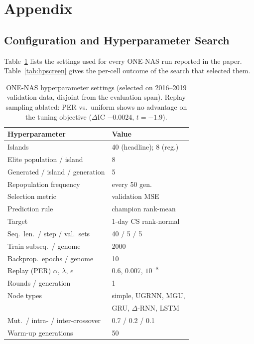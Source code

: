 
\section{Appendix}

\subsection{Configuration and Hyperparameter Search}

Table~\ref{tab:hps} lists the settings used for every ONE-NAS
run reported in the paper. Table~\ref{tab:hpscreen} gives the
per-cell outcome of the search that selected them.

\begin{table}[t]
\centering
\footnotesize
\begin{tabular}{@{}l@{\hspace{4pt}}l@{}}
\toprule
Hyperparameter & Value \\
\midrule
Islands & 40 (headline); 8 (reg.) \\
Elite population / island & 8 \\
Generated / island / generation & 5 \\
Repopulation frequency & every 50 gen. \\
Selection metric & validation MSE \\
Prediction rule & champion rank-mean \\
Target & 1-day CS rank-normal \\
Seq.\ len.\ / step / val.\ sets & 40 / 5 / 5 \\
Train subseq.\ / genome & 2000 \\
Backprop.\ epochs / genome & 10 \\
Replay (PER) $\alpha$, $\lambda$, $\epsilon$ & 0.6, 0.007, $10^{-8}$ \\
Rounds / generation & 1 \\
Node types & simple, UGRNN, MGU, \\
 & GRU, $\Delta$-RNN, LSTM \\
Mut.\ / intra- / inter-crossover & 0.7 / 0.2 / 0.1 \\
Warm-up generations & 50 \\
\bottomrule
\end{tabular}
\caption{ONE-NAS hyperparameter settings (selected on 2016--2019
validation data, disjoint from the evaluation span). Replay sampling
ablated: PER vs.\ uniform shows no advantage on the tuning objective
($\Delta$IC $-0.0024$, $t{=}-1.9$).}
\label{tab:hps}
\end{table}


